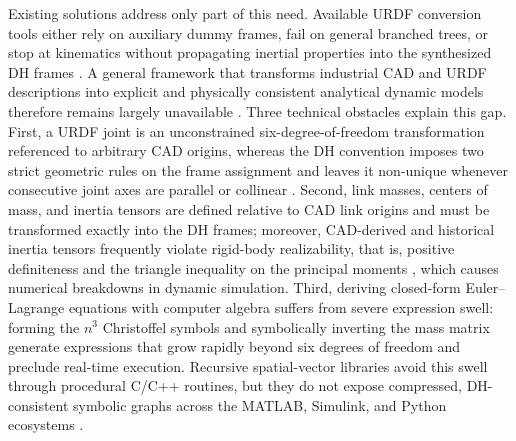 \documentclass[fleqn,10pt]{article}
\begin{document}
Existing solutions address only part of this need. Available URDF conversion tools either rely on auxiliary dummy frames, fail on general branched trees, or stop at kinematics without propagating inertial properties into the synthesized DH frames \cite{yu2024unified, tola2024understanding, chignoli2024urdf, ihab2026urdf2dt}. A general framework that transforms industrial CAD and URDF descriptions into explicit and physically consistent analytical dynamic models therefore remains largely unavailable \cite{tola2024understanding, ihab2026urdf2dt}. Three technical obstacles explain this gap. First, a URDF joint is an unconstrained six-degree-of-freedom transformation referenced to arbitrary CAD origins, whereas the DH convention imposes two strict geometric rules on the frame assignment and leaves it non-unique whenever consecutive joint axes are parallel or collinear \cite{craig2005introduction, yu2024unified, ihab2026urdf2dt}. Second, link masses, centers of mass, and inertia tensors are defined relative to CAD link origins and must be transformed exactly into the DH frames; moreover, CAD-derived and historical inertia tensors frequently violate rigid-body realizability, that is, positive definiteness and the triangle inequality on the principal moments \cite{sousa2019physical, wensing2018linear, lee2020geometric, tola2024understanding}, which causes numerical breakdowns in dynamic simulation. Third, deriving closed-form Euler--Lagrange equations with computer algebra suffers from severe expression swell: forming the $n^3$ Christoffel symbols and symbolically inverting the mass matrix generate expressions that grow rapidly beyond six degrees of freedom and preclude real-time execution. Recursive spatial-vector libraries avoid this swell through procedural C/C++ routines, but they do not expose compressed, DH-consistent symbolic graphs across the MATLAB, Simulink, and Python ecosystems \cite{carpentier2019pinocchio}.
\end{document}
